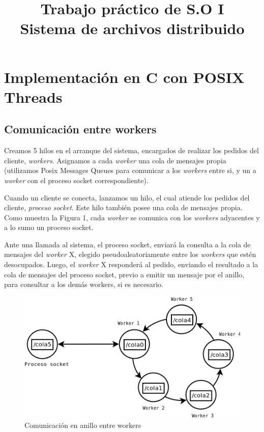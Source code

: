 \documentclass[a4paper, 8pt]{article}
\title{Trabajo práctico de S.O I \\ Sistema de archivos distribuido}
\begin{document}
\maketitle

\section{Implementación en C con POSIX Threads}

\subsection{Comunicación entre workers}

Creamos 5 hilos en el arranque del sistema, encargados de realizar los pedidos del cliente, \textit{workers}.
Asignamos a cada \textit{worker} una cola de mensajes propia (utilizamos Posix Messages Queues para comunicar a los \textit{workers} entre si,
y un a \textit{worker} con el proceso socket correspondiente).

Cuando un cliente se conecta, lanzamos un hilo, el cual atiende los pedidos del cliente, \textit{proceso socket}.
Este hilo también posee una cola de mensajes propia.
Como muestra la Figura 1, cada \textit{worker} se comunica con los \textit{workers} adyacentes y a lo sumo un proceso socket.


Ante una llamada al sistema, el proceso socket, enviará la consulta a la cola de mensajes del \textit{worker} X, elegido pseudoaleatoriamente
entre los \textit{workers} que estén desocupados.
Luego, el \textit{worker} X responderá al pedido, enviando el resultado a la cola de mensajes del proceso socket,
previo a emitir un mensaje por el anillo, para consultar a los demás workers, si es necesario.


 \begin{figure}[htbp]
   \centering
     \includegraphics[scale=0.75]{dia1.png}
     \caption{Comunicación en anillo entre workers}
   \label{Figura 1}
 \end{figure}
\end{document}
